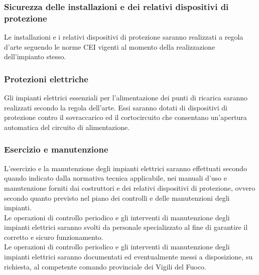 \subsubsection{Sicurezza delle installazioni e dei relativi dispositivi di protezione
}
Le installazioni e i relativi dispositivi di protezione saranno realizzati a regola d’arte seguendo le norme CEI vigenti al momento della realizzazione dell’impianto stesso.

\subsubsection{Protezioni elettriche}
Gli impianti elettrici essenziali per l’alimentazione dei punti di ricarica saranno realizzati secondo la regola dell’arte. Essi saranno dotati di dispositivi di protezione contro il sovraccarico ed il cortocircuito che consentano un’apertura automatica del circuito di alimentazione.

\subsubsection{Esercizio e manutenzione }
L’esercizio e la manutenzione degli impianti elettrici saranno effettuati secondo quando indicato dalla normativa tecnica applicabile, nei manuali d’uso e manutenzione forniti dai costruttori e dei relativi dispositivi di protezione, ovvero secondo quanto previsto nel piano dei controlli e delle manutenzioni degli impianti. \\
Le operazioni di controllo periodico e gli interventi di manutenzione degli impianti elettrici saranno svolti da personale specializzato al fine di garantire il corretto e sicuro funzionamento. \\
Le operazioni di controllo periodico e gli interventi di manutenzione degli impianti elettrici saranno documentati ed eventualmente messi a disposizione, su richiesta, al competente comando provinciale dei Vigili del Fuoco.

